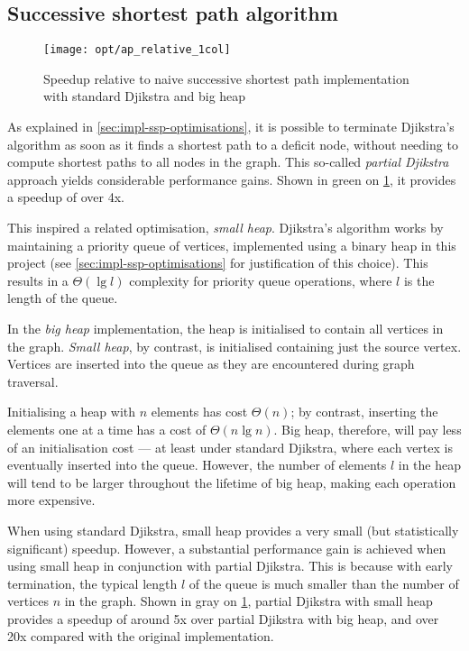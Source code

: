 \subsection{Successive shortest path algorithm}

\begin{figure}
    \centering
    \texttt{[image: opt/ap\_relative\_1col]}
    \caption{Speedup relative to naive successive shortest path implementation with standard Djikstra and big heap}
    \label{fig:opt-ap}
\end{figure}

As explained in \cref{sec:impl-ssp-optimisations}, it is possible to terminate Djikstra's algorithm as soon as it finds a shortest path to a deficit node, without needing to compute shortest paths to all nodes in the graph. This so-called \emph{partial Djikstra} approach yields considerable performance gains. Shown in green on \cref{fig:opt-ap}, it provides a speedup of over 4x.

This inspired a related optimisation, \emph{small heap}. Djikstra's algorithm works by maintaining a priority queue of vertices, implemented using a binary heap in this project (see \cref{sec:impl-ssp-optimisations} for justification of this choice). This results in a $\Theta\left(\lg l\right)$ complexity for priority queue operations, where $l$ is the length of the queue.

In the \emph{big heap} implementation, the heap is initialised to contain all vertices in the graph. \emph{Small heap}, by contrast, is initialised containing just the source vertex. Vertices are inserted into the queue as they are encountered during graph traversal.

Initialising a heap with $n$ elements has cost $\Theta(n)$; by contrast, inserting the elements one at a time has a cost of $\Theta(n\lg n)$. Big heap, therefore, will pay less of an initialisation cost --- at least under standard Djikstra, where each vertex is eventually inserted into the queue. However, the number of elements $l$ in the heap will tend to be larger throughout the lifetime of big heap, making each operation more expensive.

When using standard Djikstra, small heap provides a very small (but statistically significant) speedup. However, a substantial performance gain is achieved when using small heap in conjunction with partial Djikstra. This is because with early termination, the typical length $l$ of the queue is much smaller than the number of vertices $n$ in the graph. Shown in gray on \cref{fig:opt-ap}, partial Djikstra with small heap provides a speedup of around 5x over partial Djikstra with big heap, and over 20x compared with the original implementation.

